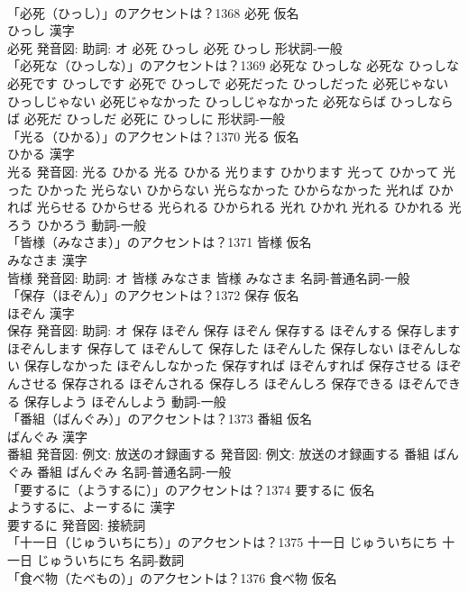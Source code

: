 \documentclass[8pt]{extreport}
\begin{document}
\begin{CJK}{UTF8}{min}
\\	「必死（ひっし）」のアクセントは？1368	必死 仮名　
\\	ひっし 漢字　
\\	必死 発音図: 助詞: オ	必死 ひっし		必死 ひっし				形状詞-一般 
\\	「必死な（ひっしな）」のアクセントは？1369		必死な ひっしな		必死な ひっしな 必死です ひっしです 必死で ひっしで 必死だった ひっしだった 必死じゃない ひっしじゃない 必死じゃなかった ひっしじゃなかった 必死ならば ひっしならば 必死だ ひっしだ 必死に ひっしに				形状詞-一般 
\\	「光る（ひかる）」のアクセントは？1370	光る 仮名　
\\	ひかる 漢字　
\\	光る 発音図:	光る ひかる		光る ひかる 光ります ひかります 光って ひかって 光った ひかった 光らない ひからない 光らなかった ひからなかった 光れば ひかれば 光らせる ひからせる 光られる ひかられる 光れ ひかれ 光れる ひかれる 光ろう ひかろう				動詞-一般 
\\	「皆様（みなさま）」のアクセントは？1371	皆様 仮名　
\\	みなさま 漢字　
\\	皆様 発音図: 助詞: オ	皆様 みなさま		皆様 みなさま				名詞-普通名詞-一般 
\\	「保存（ほぞん）」のアクセントは？1372	保存 仮名　
\\	ほぞん 漢字　
\\	保存 発音図: 助詞: オ	保存 ほぞん		保存 ほぞん 保存する ほぞんする 保存します ほぞんします 保存して ほぞんして 保存した ほぞんした 保存しない ほぞんしない 保存しなかった ほぞんしなかった 保存すれば ほぞんすれば 保存させる ほぞんさせる 保存される ほぞんされる 保存しろ ほぞんしろ 保存できる ほぞんできる 保存しよう ほぞんしよう				動詞-一般 
\\	「番組（ばんぐみ）」のアクセントは？1373	番組 仮名　
\\	ばんぐみ 漢字　
\\	番組 発音図: 例文: 放送のオ録画する 発音図: 例文: 放送のオ録画する	番組 ばんぐみ		番組 ばんぐみ				名詞-普通名詞-一般 
\\	「要するに（ようするに）」のアクセントは？1374	要するに 仮名　
\\	ようするに、よーするに 漢字　
\\	要するに 発音図:							接続詞 
\\	「十一日（じゅういちにち）」のアクセントは？1375		十一日 じゅういちにち		十一日 じゅういちにち				名詞-数詞 
\\	「食べ物（たべもの）」のアクセントは？1376	食べ物 仮名　

\end{CJK}
\end{document}
